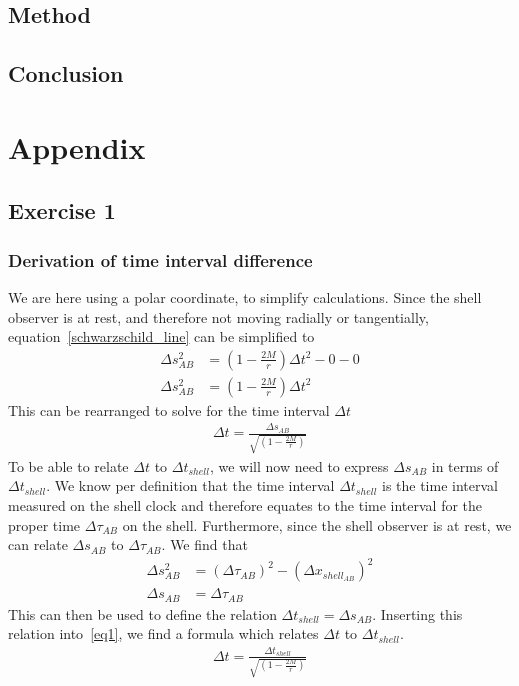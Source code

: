 \documentclass[reprint,english,notitlepage]{revtex4-2}
\begin{document}
    \subsection{Method}\label{subsec:method7}
    \subsection{Conclusion}\label{subsec:conclusion7}



\section{Appendix}\label{sec:appendix}
    \subsection{Exercise 1}\label{subsec:exercise-1}
        \subsubsection{Derivation of time interval difference}\label{subsec:derivation-of-time-interval-difference}
            We are here using a polar coordinate, to simplify calculations.
            Since the shell observer is at rest, and therefore not moving radially or tangentially, equation~\eqref{schwarzschild_line} can be simplified to
            \begin{align}
                \Delta s^2_{AB} &= \left(1-\frac{2M}{r}\right) \Delta t^2 - 0 - 0\\
                \Delta s^2_{AB} &= \left(1-\frac{2M}{r}\right) \Delta t^2
            \end{align}
            This can be rearranged to solve for the time interval $\Delta t$
            \begin{align}
                \Delta t = \frac{\Delta s_{AB}}{\sqrt{\left(1-\frac{2M}{r}\right)}} \label{eq1}
            \end{align}
            To be able to relate $\Delta t$ to $\Delta t_{shell}$, we will now need to express $\Delta s_{AB}$ in terms of $\Delta t_{shell}$.
            We know per definition that the time interval $\Delta t_{shell}$ is the time interval measured on the shell clock and therefore equates to the time interval for the proper time $\Delta \tau_{AB}$ on the shell.
            Furthermore, since the shell observer is at rest, we can relate $\Delta s_{AB}$ to $\Delta \tau_{AB}$.
            We find that
            \begin{align}
                \Delta s^2_{AB} &= (\Delta \tau_{AB})^2 - (\Delta x_{shell}_{AB})^2\\
                \Delta s_{AB} &= \Delta \tau_{AB}
            \end{align}
            This can then be used to define the relation $\Delta t_{shell} = \Delta s_{AB}$.
            Inserting this relation into~\eqref{eq1}, we find a formula which relates $\Delta t$ to $\Delta t_{shell}$.
            \begin{align}
                \Delta t = \frac{\Delta t_{shell}}{\sqrt{\left(1-\frac{2M}{r}\right)}}
            \end{align}
\end{document}
